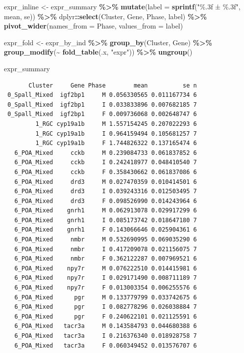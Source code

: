 \documentclass[
  landscape]{article}
\newenvironment{Shaded}{\begin{snugshade}}{\end{snugshade}}
\newcommand{\AttributeTok}[1]{\textcolor[rgb]{0.13,0.29,0.53}{#1}}
\newcommand{\FunctionTok}[1]{\textcolor[rgb]{0.13,0.29,0.53}{\textbf{#1}}}
\newcommand{\NormalTok}[1]{#1}
\newcommand{\OtherTok}[1]{\textcolor[rgb]{0.56,0.35,0.01}{#1}}
\newcommand{\SpecialCharTok}[1]{\textcolor[rgb]{0.81,0.36,0.00}{\textbf{#1}}}
\newcommand{\StringTok}[1]{\textcolor[rgb]{0.31,0.60,0.02}{#1}}
\begin{document}
\begin{Shaded}
\begin{Highlighting}[]
\NormalTok{expr\_inline }\OtherTok{\textless{}{-}}\NormalTok{ expr\_summary }\SpecialCharTok{\%\textgreater{}\%}
  \FunctionTok{mutate}\NormalTok{(}\AttributeTok{label =} \FunctionTok{sprintf}\NormalTok{(}\StringTok{"\%.3f ± \%.3f"}\NormalTok{, mean, se)) }\SpecialCharTok{\%\textgreater{}\%}
\NormalTok{  dplyr}\SpecialCharTok{::}\FunctionTok{select}\NormalTok{(Cluster, Gene, Phase, label) }\SpecialCharTok{\%\textgreater{}\%}
  \FunctionTok{pivot\_wider}\NormalTok{(}\AttributeTok{names\_from =}\NormalTok{ Phase, }\AttributeTok{values\_from =}\NormalTok{ label)}

\NormalTok{expr\_fold }\OtherTok{\textless{}{-}}\NormalTok{ expr\_by\_ind }\SpecialCharTok{\%\textgreater{}\%}
  \FunctionTok{group\_by}\NormalTok{(Cluster, Gene) }\SpecialCharTok{\%\textgreater{}\%}
  \FunctionTok{group\_modify}\NormalTok{(}\SpecialCharTok{\textasciitilde{}} \FunctionTok{fold\_table}\NormalTok{(.x, }\StringTok{"expr"}\NormalTok{)) }\SpecialCharTok{\%\textgreater{}\%}
  \FunctionTok{ungroup}\NormalTok{()}

\NormalTok{expr\_summary}
\end{Highlighting}
\end{Shaded}

\begin{verbatim}
       Cluster     Gene Phase        mean          se n
 0_Spall_Mixed  igf2bp1     M 0.056330565 0.011167734 6
 0_Spall_Mixed  igf2bp1     I 0.033833896 0.007682185 7
 0_Spall_Mixed  igf2bp1     F 0.009736068 0.002648747 6
         1_RGC cyp19a1b     M 1.557154245 0.207022293 6
         1_RGC cyp19a1b     I 0.964159494 0.105681257 7
         1_RGC cyp19a1b     F 1.744826322 0.137165474 6
   6_POA_Mixed     cckb     M 0.239084733 0.061837852 6
   6_POA_Mixed     cckb     I 0.242418977 0.048410540 7
   6_POA_Mixed     cckb     F 0.358430662 0.061837086 6
   6_POA_Mixed     drd3     M 0.027470359 0.010414501 6
   6_POA_Mixed     drd3     I 0.039243316 0.012503495 7
   6_POA_Mixed     drd3     F 0.098526990 0.014243964 6
   6_POA_Mixed    gnrh1     M 0.062913078 0.029917299 6
   6_POA_Mixed    gnrh1     I 0.085173742 0.018647180 7
   6_POA_Mixed    gnrh1     F 0.143066646 0.025904361 6
   6_POA_Mixed     nmbr     M 0.532690995 0.069035290 6
   6_POA_Mixed     nmbr     I 0.417209078 0.021156075 7
   6_POA_Mixed     nmbr     F 0.362122287 0.007969521 6
   6_POA_Mixed    npy7r     M 0.076222510 0.014415981 6
   6_POA_Mixed    npy7r     I 0.029171490 0.008711189 7
   6_POA_Mixed    npy7r     F 0.013003354 0.006255576 6
   6_POA_Mixed      pgr     M 0.133779799 0.033742675 6
   6_POA_Mixed      pgr     I 0.082778296 0.026038884 7
   6_POA_Mixed      pgr     F 0.240622101 0.021125591 6
   6_POA_Mixed   tacr3a     M 0.143584793 0.044680388 6
   6_POA_Mixed   tacr3a     I 0.216376340 0.018928758 7
   6_POA_Mixed   tacr3a     F 0.060349452 0.013576707 6
\end{verbatim}
\end{document}
